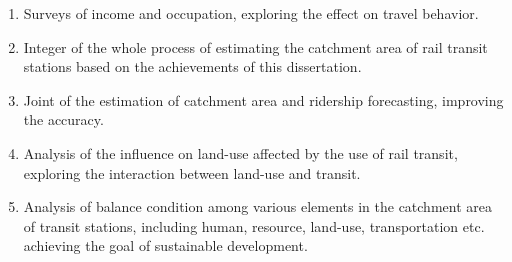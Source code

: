 \begin{enumerate}
	\item Surveys of income and occupation, exploring the effect on travel behavior.
	
	\item Integer of the whole process of estimating the catchment area of rail transit stations based on the achievements of this dissertation.
	
	\item Joint of the estimation of catchment area and ridership forecasting, improving the accuracy.
	
	\item Analysis of the influence on land-use affected by the use of rail transit, exploring the interaction between land-use and transit.
	
	\item Analysis of balance condition among various elements in the catchment area of transit stations, including human, resource, land-use, transportation etc. achieving the goal of sustainable development.
\end{enumerate}

\clearpage %

% 
% 